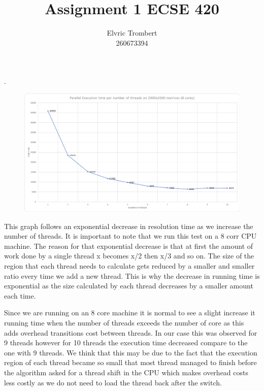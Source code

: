\documentclass[11pt,letterpaper]{exam}
\author{Elvric Trombert\\260673394}%
\title{Assignment 1 ECSE 420}
\begin{document}
	\maketitle
	\hrulefill
	\begin{questions}
		\question
			.
			\begin{figure}[h!]
				\centering
				\includegraphics[scale=0.5]{ExecutionTimeThread}
			\end{figure}
		
			This graph follows an exponential decrease in resolution time as we increase the number of threads. It is important to note that we run this test on a 8 corr CPU machine. The reason for that exponential decrease is that at first the amount of work done by a single thread x becomes x/2 then x/3 and so on. The size of the region that each thread needs to calculate gets reduced by a smaller and smaller ratio every time we add a new thread. This is why the decrease in running time is exponential as the size calculated by each thread decreases by a smaller amount each time.
			
			\quad Since we are running on an 8 core machine it is normal to see a slight increase it running time when the number of threads exceeds the number of core as this adds overhead transitions cost between threads. In our case this was observed for 9 threads however for 10 threads the execution time decreased compare to the one with 9 threads. We think that this may be due to the fact that the execution region of each thread became so small that most thread managed to finish before the algorithm asked for a thread shift in the CPU which makes overhead costs less costly as we do not need to load the thread back after the switch.
			

\end{questions}
\end{document}
